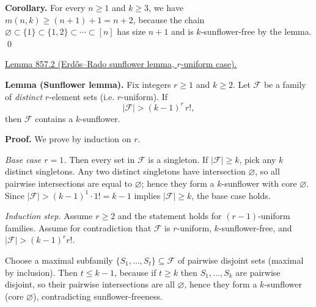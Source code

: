 \textbf{Corollary.}
For every $n\ge 1$ and $k\ge 3$, we have $m(n,k)\ge (n+1)+1 = n+2$, because the chain
$\varnothing \subset \{1\} \subset \{1,2\} \subset \cdots \subset [n]$
has size $n+1$ and is $k$-sunflower-free by the lemma.
\qed

\medskip
\noindent\underline{Lemma 857.2 (Erd\H{o}s--Rado sunflower lemma, $r$-uniform case).}

\textbf{Lemma (Sunflower lemma).}
Fix integers $r\ge 1$ and $k\ge 2$. Let $\mathcal F$ be a family of \emph{distinct} $r$-element sets (i.e. $r$-uniform). If
\[
|\mathcal F| > (k-1)^r\, r! ,
\]
then $\mathcal F$ contains a $k$-sunflower.

\textbf{Proof.}
We prove by induction on $r$.

\emph{Base case $r=1$.} Then every set in $\mathcal F$ is a singleton. If $|\mathcal F|\ge k$, pick any $k$ distinct singletons. Any two distinct singletons have intersection $\varnothing$, so all pairwise intersections are equal to $\varnothing$; hence they form a $k$-sunflower with core $\varnothing$. Since $|\mathcal F|>(k-1)^1\cdot 1!=k-1$ implies $|\mathcal F|\ge k$, the base case holds.

\emph{Induction step.} Assume $r\ge 2$ and the statement holds for $(r-1)$-uniform families.
Assume for contradiction that $\mathcal F$ is $r$-uniform, $k$-sunflower-free, and $|\mathcal F|>(k-1)^r r!$.

Choose a maximal subfamily $\{S_1,\dots,S_t\}\subseteq\mathcal F$ of pairwise disjoint sets (maximal by inclusion). Then $t\le k-1$, because if $t\ge k$ then $S_1,\dots,S_k$ are pairwise disjoint, so their pairwise intersections are all $\varnothing$, hence they form a $k$-sunflower (core $\varnothing$), contradicting sunflower-freeness.

